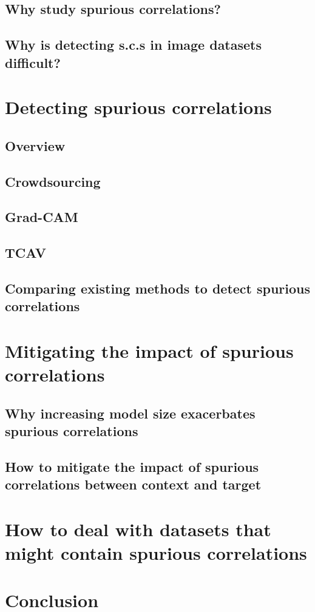 \documentclass{article}
\begin{document}
\subsection{Why study spurious correlations?}

\subsection{Why is detecting s.c.s in image datasets difficult?}

\section{Detecting spurious correlations}
\subsection{Overview}
\subsection{Crowdsourcing}
\subsection{Grad-CAM}
\subsection{TCAV}
\subsection{Comparing existing methods to detect spurious correlations}

\section{Mitigating the impact of spurious correlations}
\subsection{Why increasing model size exacerbates spurious correlations}
\subsection{How to mitigate the impact of spurious correlations between context and target}

\section{How to deal with datasets that might contain spurious correlations}

\section{Conclusion}

\printbibliography
\end{document}
